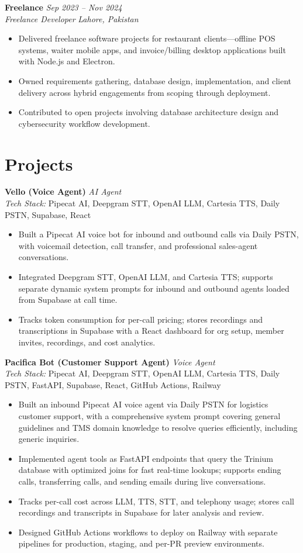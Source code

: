 \documentclass[11pt,a4paper]{article}
\newcommand{\resumeSubheading}[4]{%
  \textbf{#1} \hfill \textit{#2} \\
  \textit{#3} \hfill \textit{#4} \\
}
\newcommand{\resumeItemList}{\begin{itemize}[leftmargin=*, nosep, topsep=2pt]}
\newcommand{\resumeItemListEnd}{\end{itemize}}
\begin{document}
\vspace{4pt}

\resumeSubheading{Freelance}{Sep 2023 -- Nov 2024}{Freelance Developer}{Lahore, Pakistan}
\resumeItemList
  \item Delivered freelance software projects for restaurant clients---offline POS systems, waiter mobile apps, and invoice/billing desktop applications built with Node.js and Electron.
  \item Owned requirements gathering, database design, implementation, and client delivery across hybrid engagements from scoping through deployment.
  \item Contributed to open projects involving database architecture design and cybersecurity workflow development.
\resumeItemListEnd

\section{Projects}

\textbf{Vello (Voice Agent)} \hfill \textit{AI Agent} \\
\textit{Tech Stack:} Pipecat AI, Deepgram STT, OpenAI LLM, Cartesia TTS, Daily PSTN, Supabase, React
\resumeItemList
  \item Built a Pipecat AI voice bot for inbound and outbound calls via Daily PSTN, with voicemail detection, call transfer, and professional sales-agent conversations.
  \item Integrated Deepgram STT, OpenAI LLM, and Cartesia TTS; supports separate dynamic system prompts for inbound and outbound agents loaded from Supabase at call time.
  \item Tracks token consumption for per-call pricing; stores recordings and transcriptions in Supabase with a React dashboard for org setup, member invites, recordings, and cost analytics.
\resumeItemListEnd

\vspace{4pt}

\textbf{Pacifica Bot (Customer Support Agent)} \hfill \textit{Voice Agent} \\
\textit{Tech Stack:} Pipecat AI, Deepgram STT, OpenAI LLM, Cartesia TTS, Daily PSTN, FastAPI, Supabase, React, GitHub Actions, Railway
\resumeItemList
  \item Built an inbound Pipecat AI voice agent via Daily PSTN for logistics customer support, with a comprehensive system prompt covering general guidelines and TMS domain knowledge to resolve queries efficiently, including generic inquiries.
  \item Implemented agent tools as FastAPI endpoints that query the Trinium database with optimized joins for fast real-time lookups; supports ending calls, transferring calls, and sending emails during live conversations.
  \item Tracks per-call cost across LLM, TTS, STT, and telephony usage; stores call recordings and transcripts in Supabase for later analysis and review.
  \item Designed GitHub Actions workflows to deploy on Railway with separate pipelines for production, staging, and per-PR preview environments.
\resumeItemListEnd
\end{document}
